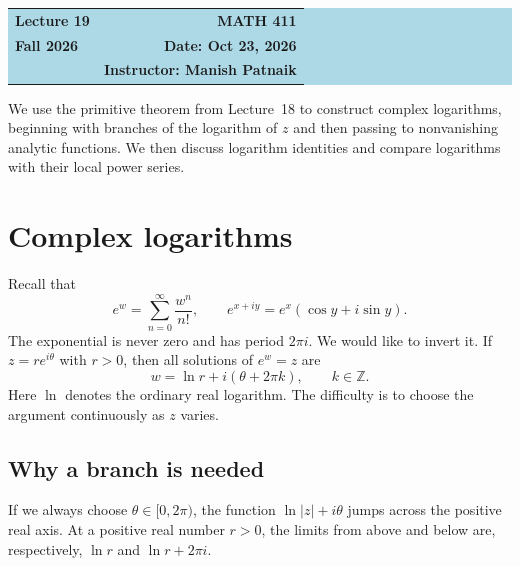 \documentclass[11pt]{article}
\theoremstyle{plain}
\theoremstyle{definition}
\theoremstyle{remark}
\numberwithin{equation}{section}
\newcommand{\Z}{\mathbb{Z}}
\begin{document}
\begin{center}
  \colorbox{lightblue}{%
    \begin{minipage}{0.94\textwidth}
      \vspace{0.55em}
      \begin{tabular*}{\textwidth}{@{\extracolsep{\fill}}lr}
        {\color{courseblue}\bfseries\LARGE Lecture 19} &
        {\color{courseblue}\bfseries\LARGE MATH 411}\\[0.35em]
        \textbf{Fall 2026} & \textbf{Date: Oct 23, 2026}\\
        & \textbf{Instructor: Manish Patnaik}
      \end{tabular*}
      \vspace{0.45em}
    \end{minipage}}
\end{center}

\setcounter{tocdepth}{1}
\tableofcontents
\vspace{0.45em}


We use the primitive theorem from Lecture~18 to construct complex
logarithms, beginning with branches of the logarithm of $z$ and then
passing to nonvanishing analytic functions.
We then discuss logarithm identities and compare logarithms with their
local power series.

\section{Complex logarithms}
Recall that
\[
 e^w=\sum_{n=0}^\infty\frac{w^n}{n!},\qquad
 e^{x+iy}=e^x(\cos y+i\sin y).
\]
The exponential is never zero and has period $2\pi i$. We would like to
invert it. If $z=re^{i\theta}$ with $r>0$, then all solutions of $e^w=z$ are
\[
 w=\ln r+i(\theta+2\pi k),\qquad k\in\Z.
\]
Here $\ln$ denotes the ordinary real logarithm. The difficulty is to
choose the argument continuously as $z$ varies.

\subsection{Why a branch is needed}
If we always choose $\theta\in[0,2\pi)$, the function
$\ln|z|+i\theta$ jumps across the positive real axis. At a positive
real number $r>0$, the limits from above and below are, respectively,
$\ln r$ and $\ln r+2\pi i$.
\end{document}
